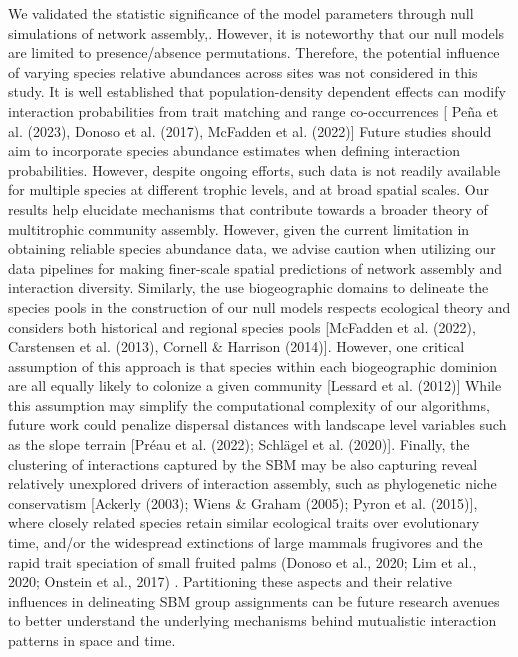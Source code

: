 \documentclass[
]{agujournal2019}
\begin{document}
We validated the statistic significance of the model parameters through
null simulations of network assembly,. However, it is noteworthy that
our null models are limited to presence/absence permutations. Therefore,
the potential influence of varying species relative abundances across
sites was not considered in this study. It is well established that
population-density dependent effects can modify interaction
probabilities from trait matching and range co-occurrences {[} Peña et
al. (2023), Donoso et al. (2017), McFadden et al. (2022){]} Future
studies should aim to incorporate species abundance estimates when
defining interaction probabilities. However, despite ongoing efforts,
such data is not readily available for multiple species at different
trophic levels, and at broad spatial scales. Our results help elucidate
mechanisms that contribute towards a broader theory of multitrophic
community assembly. However, given the current limitation in obtaining
reliable species abundance data, we advise caution when utilizing our
data pipelines for making finer-scale spatial predictions of network
assembly and interaction diversity. Similarly, the use biogeographic
domains to delineate the species pools in the construction of our null
models respects ecological theory and considers both historical and
regional species pools {[}McFadden et al. (2022), Carstensen et al.
(2013), Cornell \& Harrison (2014){]}. However, one critical assumption
of this approach is that species within each biogeographic dominion are
all equally likely to colonize a given community {[}Lessard et al.
(2012){]} While this assumption may simplify the computational
complexity of our algorithms, future work could penalize dispersal
distances with landscape level variables such as the slope terrain
{[}Préau et al. (2022); Schlägel et al. (2020){]}. Finally, the
clustering of interactions captured by the SBM may be also capturing
reveal relatively unexplored drivers of interaction assembly, such as
phylogenetic niche conservatism {[}Ackerly (2003); Wiens \& Graham
(2005); Pyron et al. (2015){]}, where closely related species retain
similar ecological traits over evolutionary time, and/or the widespread
extinctions of large mammals frugivores and the rapid trait speciation
of small fruited palms (Donoso et al., 2020; Lim et al., 2020; Onstein
et al., 2017) . Partitioning these aspects and their relative influences
in delineating SBM group assignments can be future research avenues to
better understand the underlying mechanisms behind mutualistic
interaction patterns in space and time.
\end{document}
